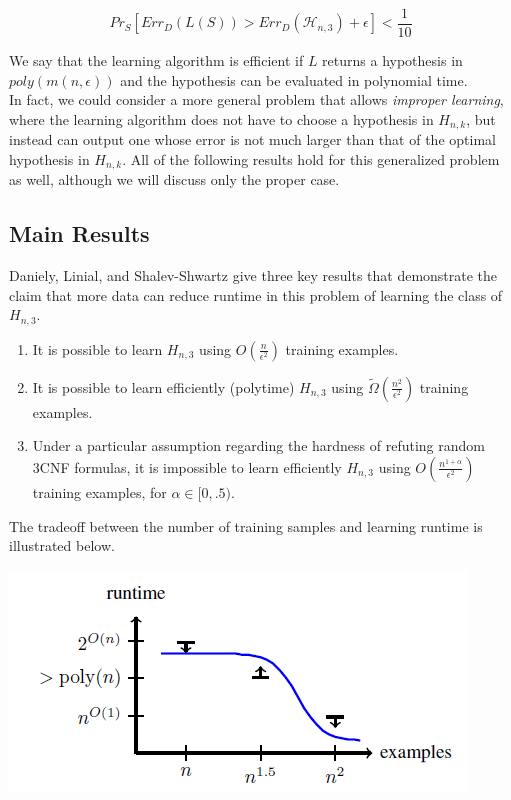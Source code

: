 \documentclass[11pt,a4paper]{article}
\begin{document}
$$ Pr_{S}[ Err_D(L(S)) > Err_D(\mathcal{H}_{n,3}) + \epsilon ] < \frac{1}{10}$$

We say that the learning algorithm is efficient if $L$ returns a hypothesis in $poly(m(n, \epsilon) )$ and the hypothesis can be evaluated in polynomial time.\\

In fact, we could consider a more general problem that allows \textit{improper learning}, where the learning algorithm does not have to choose a hypothesis in $H_{n, k}$, but instead can output one whose error is not much larger than that of the optimal hypothesis in $H_{n, k}$. All of the following results hold for this generalized problem as well, although we will discuss only the proper case.

\subsection{Main Results}

Daniely, Linial, and Shalev-Shwartz give three key results that demonstrate the claim that more data can reduce runtime in this problem of learning the class of $H_{n, 3}$.

\begin{enumerate}

\item It is possible to learn $H_{n, 3}$ using $O(\frac{n}{\epsilon^2})$ training examples.
\item It is possible to learn efficiently (polytime) $H_{n, 3}$ using $\tilde\Omega(\frac{n^2}{\epsilon^2})$ training examples.
\item Under a particular assumption regarding the hardness of refuting random 3CNF formulas, it is impossible to learn efficiently $H_{n, 3}$ using $O(\frac{n^{1 + \alpha}}{\epsilon^2})$ training examples, for $\alpha \in [0, .5)$.

\end{enumerate}

The tradeoff between the number of training samples and learning runtime is illustrated below.

\includegraphics[scale=1]{tradeoff_graph}
\end{document}
